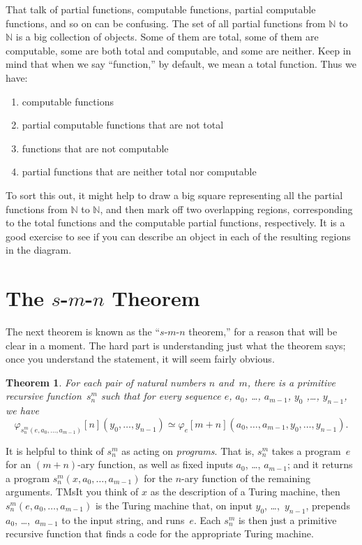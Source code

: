 \documentclass[10pt,a4paper]{article}
\theoremstyle{plain}
\newtheorem{thm}{Theorem}[section]
\theoremstyle{definition}
\theoremstyle{remark}
\newenvironment{explain}{}{}
\newcommand*{\olfileid}[3]{}
\newcommand*{\olsection}[1]{\section*{#1}}
\newcommand*{\ollabel}[1]{\label{#1}}
\providecommand{\cfind}[1]{\varphi_{#1}}
\providecommand{\Nat}{\ensuremath{\mathbb{N}}}
\providecommand{\iftag}[1]{#1}
\providecommand{\iftag}{}
\begin{document}
That talk of partial functions, computable functions,
partial computable functions, and so on can be confusing. The set of
all partial functions from $\Nat$ to $\Nat$ is a big collection of
objects. Some of them are total, some of them are computable, some are
both total and computable, and some are neither. Keep in mind that
when we say ``function,'' by default, we mean a total function. Thus we
have:
\begin{enumerate}
\item computable functions
\item partial computable functions that are not total
\item functions that are not computable
\item partial functions that are neither total nor computable
\end{enumerate}
To sort this out, it might help to draw a big square representing all
the partial functions from $\Nat$ to $\Nat$, and then mark off two
overlapping regions, corresponding to the total functions and the
computable partial functions, respectively. It is a good exercise to
see if you can describe an object in each of the resulting regions in
the diagram.





\olfileid{cmp}{thy}{smn}
\olsection{The $s$-$m$-$n$ Theorem}

\begin{explain}
The next theorem is known as the ``$s$-$m$-$n$ theorem,'' for a reason
that will be clear in a moment. The hard part is understanding just
what the theorem says; once you understand the statement, it will seem
fairly obvious.
\end{explain}

\begin{thm}
\ollabel{thm:s-m-n}
  For each pair of natural numbers $n$ and~$m$, there is a primitive
  recursive function~$s^m_n$ such that for every sequence
  $e$, $a_0$, \dots, $a_{m-1}$, $y_0$ ,\dots, $y_{n-1}$, we have
  \[
  \cfind{s^m_n(e, a_0, \dots, a_{m-1})}[n](y_0, \dots, y_{n-1}) \simeq
  \cfind{e}[m+n](a_0, \dots, a_{m-1}, y_0, \dots, y_{n-1}).
\]
\end{thm}

\begin{explain}
It is helpful to think of $s^m_n$ as acting on \emph{programs}. That
is, $s^m_n$ takes a program~$e$ for an $(m+n)$-ary function, as well
as fixed inputs $a_0$, \dots, $a_{m-1}$; and it returns a program
$s^m_n(x, a_0, \dots, a_{m-1})$ for the $n$-ary function of the
remaining arguments. \iftag{TMs}{It you think of $x$ as the description of a
Turing machine, then $s^m_n(e, a_0, \dots, a_{m-1})$ is the Turing
machine that, on input $y_0$, \dots,~$y_{n-1}$, prepends
$a_0$, \dots,~$a_{m-1}$ to the input string, and runs~$e$. Each $s^m_n$
is then just a primitive recursive function that finds a code for the
appropriate Turing machine.}{}
\end{explain}
\end{document}
